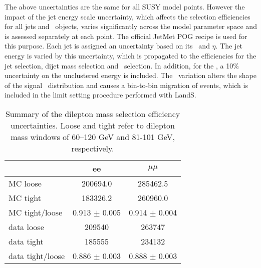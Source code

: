 The above uncertainties are the same for all SUSY model points. However the impact of the jet energy scale uncertainty, which
affects the selection efficiencies for all jets and \MET\ objects, varies significantly across the model parameter space and
is assessed separately at each point. The official JetMet POG recipe is used for this purpose. Each jet is assigned an uncertainty
based on its \pt\ and $\eta$. The jet energy is varied by this uncertainty, which is propagated to the efficiencies for the jet selection, 
dijet mass selection and \MET\ selection. In addition, for the \MET, a 10\% uncertainty on the unclustered energy is included.
The \MET\ variation alters the shape of the signal \MET\ distribution and causes a bin-to-bin migration of events, which is 
included in the limit setting procedure performed with LandS.

\begin{table}[htb]
\begin{center}
\footnotesize
\caption{\label{tab:mllsyst} Summary of the dilepton mass selection efficiency uncertainties. Loose and tight refer to dilepton
mass windows of 60--120 GeV and 81-101 GeV, respectively.}
\begin{tabular}{l|c|c}
\hline
\hline
 & ee & $\mu\mu$ \\
\hline
MC loose & 200694.0 & 285462.5 \\
MC tight & 183326.2 & 260960.0 \\  
MC tight/loose & 0.913 $\pm$ 0.005 & 0.914 $\pm$ 0.004 \\
\hline
data loose & 209540 & 263747 \\
data tight & 185555 & 234132 \\
data tight/loose & 0.886 $\pm$ 0.003 & 0.888 $\pm$ 0.003 \\
\hline
\hline
\end{tabular}
\end{center}
\end{table}
